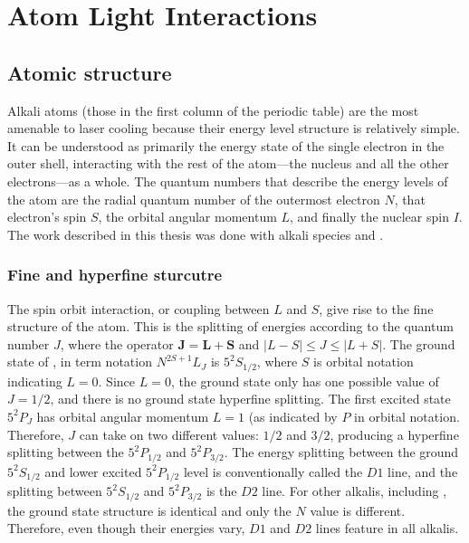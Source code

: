 \renewcommand{\thechapter}{1}

\chapter{Atom Light Interactions}

\section{Atomic structure}

Alkali atoms (those in the first column of the periodic table) are the most amenable to laser cooling because their energy level structure is relatively simple. It can be understood as primarily the energy state of the single electron in the outer shell, interacting with the rest of the atom---the nucleus and all the other electrons---as a whole. The quantum numbers that describe the energy levels of the atom are the radial quantum number of the outermost electron $N$, that electron's spin $S$, the orbital angular momentum $L$, and finally the nuclear spin $I$. The work described in this thesis was done with alkali species \Rb{} and \K{}.

\subsection{Fine and hyperfine sturcutre}\label{sec:hyperfine}

The spin orbit interaction, or coupling between $L$ and $S$, give rise to the fine structure of the atom. This is the splitting of energies according to the quantum number $J$, where the operator $\textbf{J}=\textbf{L}+\textbf{S}$ and $|L - S| \leq J \leq |L + S|$.  The ground state of \Rb{}, in term notation $N^{2S+1}L_J$ is $5^2S_{1/2}$, where $S$ is orbital notation indicating $L=0$. Since $L=0$, the ground state only has one possible value of $J=1/2$, and there is no ground state hyperfine splitting. The first excited state $5^2P_J$ has orbital angular momentum $L=1$ (as indicated by $P$ in orbital notation. Therefore, $J$ can take on two different values: $1/2$ and $3/2$, producing a hyperfine splitting between the $5^2P_{1/2}$ and $5^2P_{3/2}$. The energy splitting between the ground $5^2S_{1/2}$ and lower excited $5^2P_{1/2}$ level is conventionally called the $D1$ line, and the splitting between $5^2S_{1/2}$ and  $5^2P_{3/2}$ is the $D2$ line. For other alkalis, including \K{}, the ground state structure is identical and only the $N$ value is different. Therefore, even though their energies vary, $D1$ and $D2$ lines feature in all alkalis.


